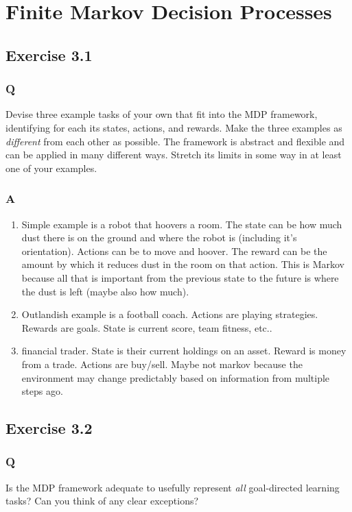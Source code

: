 \section{Finite Markov Decision Processes}

\subsection{Exercise 3.1}
\subsubsection*{Q}
Devise three example tasks of your own that fit into the MDP framework, identifying for each its states, actions, and rewards. Make the three examples as \emph{different} from each other as possible. The framework is abstract and flexible and can be applied in many different ways. Stretch its limits in some way in at least one of your examples.

\subsubsection*{A}
\begin{enumerate}
    \item Simple example is a robot that hoovers a room. The state can be how much dust there is on the ground and where the robot is (including it's orientation). Actions can be to move and hoover. The reward can be the amount by which it reduces dust in the room on that action. This is Markov because all that is important from the previous state to the future is where the dust is left (maybe also how much).
    \item Outlandish example is a football coach. Actions are playing strategies. Rewards are goals. State is current score, team fitness, etc..
    \item financial trader. State is their current holdings on an asset. Reward is money from a trade. Actions are buy/sell. Maybe not markov because the environment may change predictably based on information from multiple steps ago.
\end{enumerate}

\subsection{Exercise 3.2}
\subsubsection*{Q}
Is the MDP framework adequate to usefully represent \emph{all} goal-directed learning tasks? Can you think of any clear exceptions?


